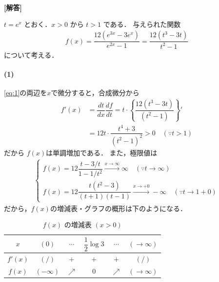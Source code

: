 \documentclass[../../main.tex]{subfiles}
\begin{document}
\begin{oframed}
  
\end{oframed}

{\bf [解答]}

$t = e^x$ とおく．$x > 0$ から $t > 1$ である．
与えられた関数
\begin{align}
  f(x)
  =\dfrac{12(e^{3x}-3e^x)}{e^{2x}-1}
  = \dfrac{12(t^{3}-3t)}{t^{2}-1} \label{eq:1}
\end{align}
について考える．

\paragraph{(1)}

\cref{eq:1}の両辺を$x$で微分すると，合成微分から
\begin{align}
  f'(x)
  &= \dfrac{dt}{dx} \dfrac{df}{dt}
  = t \cdot \left\{ \dfrac{12(t^3 - 3t)}{(t^2 - 1)} \right\}' \\
  &= 12t \cdot \dfrac{t^4 + 3}{(t^2 - 1)^2} > 0 \quad (\because t > 1)
\end{align}
だから $f(x)$は単調増加である．
また，極限値は
\begin{align}
  \begin{cases}
    f(x) = 12 \dfrac{t - 3/t}{1 - 1/t^2} \xrightarrow{x \to \infty} \infty \quad (\because t \to \infty) \\
    f(x) = 12 \dfrac{t(t^2 - 3)}{(t+1)(t-1)} \xrightarrow{x \to +0} -\infty \quad (\because t \to 1+0)
  \end{cases}
\end{align}
だから，$f(x)$の増減表・グラフの概形は下のようになる．

\begin{table}[htb]
  \centering
  \caption{$f(x)$ の増減表 $(x > 0)$}
  \label{tab:fx_monotonicity}
  \renewcommand{\arraystretch}{1.5}
  \begin{tabular}{c|ccccc}
    \hline
    $x$      & $(0)$       & $\cdots$   & $\dfrac{1}{2}\log 3$ & $\cdots$   & $(\to\infty)$ \\ \hline
    $f'(x)$  & $(/)$       & $+$        & $+$                  & $+$        & $(/)$         \\ \hline
    $f(x)$   & $(-\infty)$ & $\nearrow$ & $0$                  & $\nearrow$ & $(\to\infty)$ \\ \hline
  \end{tabular}
\end{table}
\end{document}
